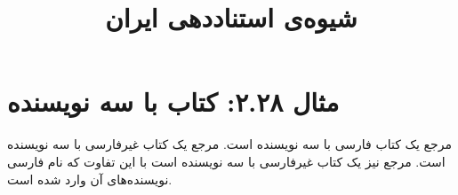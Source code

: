 \documentclass[a4paper,10pt]{article}
\begin{document}
\title{شیوه‌ی استناددهی ایران
 }
\author{}
\date{}
\maketitle



\section*{مثال ۲.۲۸: کتاب با سه نویسنده}

مرجع \cite{صارمی1372} یک کتاب فارسی با سه نویسنده است. مرجع \cite{merk1987} یک کتاب غیرفارسی با سه نویسنده است. مرجع \cite{salmon2009} نیز یک کتاب غیرفارسی با سه نویسنده است با این تفاوت که نام فارسی نویسنده‌های آن وارد شده است.






\end{document}

